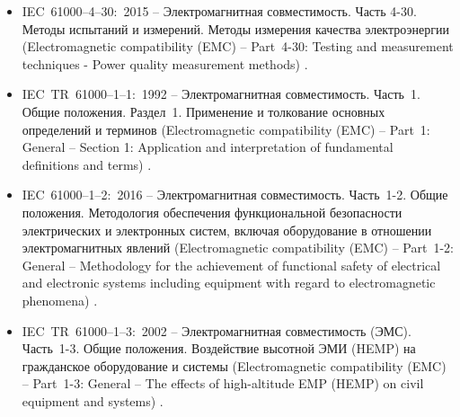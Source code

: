 \begin{itemize}
	\item IEC~61000--4--30:~2015 -- Электромагнитная совместимость. Часть 4-30. Методы испытаний и измерений. Методы измерения качества электроэнергии (Electromagnetic compatibility (EMC) -- Part~4-30: Testing and measurement techniques - Power quality measurement methods) \cite{IEC61000-4-30:2015}.
	\item IEC~TR~61000--1--1:~1992 -- Электромагнитная совместимость. Часть~1. Общие положения. Раздел~1. Применение и толкование основных определений и терминов (Electromagnetic compatibility (EMC) -- Part~1: General -- Section 1: Application and interpretation of fundamental definitions and terms) \cite{IEC_TR_61000-1-1:1992}.
	\item IEC~61000--1--2:~2016 -- Электромагнитная совместимость. Часть~1-2. Общие положения. Методология обеспечения функциональной безопасности электрических и электронных систем, включая оборудование в отношении электромагнитных явлений (Electromagnetic compatibility (EMC) -- Part~1-2: General -- Methodology for the achievement of functional safety of electrical and electronic systems including equipment with regard to electromagnetic phenomena) \cite{IEC61000-1-2:2016}.
	\item IEC~TR~61000--1--3:~2002 -- Электромагнитная совместимость (ЭМС). Часть~1-3. Общие положения. Воздействие высотной ЭМИ (HEMP) на гражданское оборудование и системы (Electromagnetic compatibility (EMC) -- Part~1-3: General -- The effects of high-altitude EMP (HEMP) on civil equipment and systems) \cite{IECTR61000-1-3:2002}.
\end{itemize}




